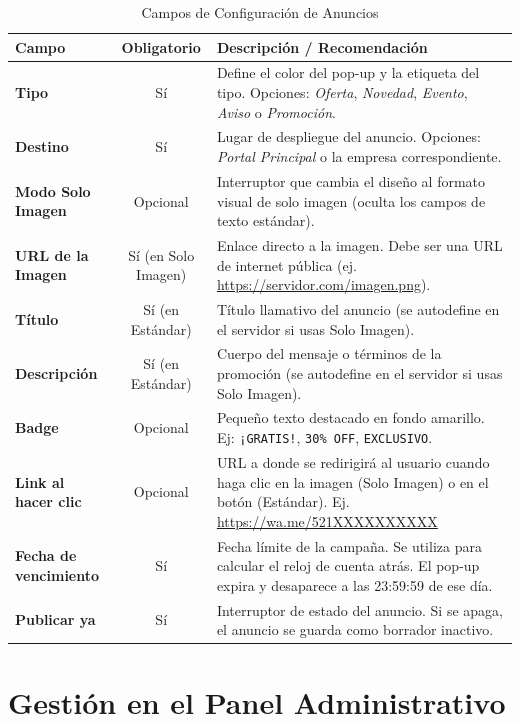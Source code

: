 \documentclass[11pt,a4paper]{article}
\begin{document}
\begin{table}[htbp]
\centering
\caption{Campos de Configuración de Anuncios}
\label{tab:campos}
\begin{tabular}{m{3cm} c m{9cm}}
\toprule
\textbf{Campo} & \textbf{Obligatorio} & \textbf{Descripción / Recomendación} \\
\midrule
\textbf{Tipo} & Sí & Define el color del pop-up y la etiqueta del tipo. Opciones: \textit{Oferta}, \textit{Novedad}, \textit{Evento}, \textit{Aviso} o \textit{Promoción}. \\
\addlinespace
\textbf{Destino} & Sí & Lugar de despliegue del anuncio. Opciones: \textit{Portal Principal} o la empresa correspondiente. \\
\addlinespace
\textbf{Modo Solo Imagen} & Opcional & Interruptor que cambia el diseño al formato visual de solo imagen (oculta los campos de texto estándar). \\
\addlinespace
\textbf{URL de la Imagen} & Sí (en Solo Imagen) & Enlace directo a la imagen. Debe ser una URL de internet pública (ej. \url{https://servidor.com/imagen.png}). \\
\addlinespace
\textbf{Título} & Sí (en Estándar) & Título llamativo del anuncio (se autodefine en el servidor si usas Solo Imagen). \\
\addlinespace
\textbf{Descripción} & Sí (en Estándar) & Cuerpo del mensaje o términos de la promoción (se autodefine en el servidor si usas Solo Imagen). \\
\addlinespace
\textbf{Badge} & Opcional & Pequeño texto destacado en fondo amarillo. Ej: \texttt{¡GRATIS!}, \texttt{30\% OFF}, \texttt{EXCLUSIVO}. \\
\addlinespace
\textbf{Link al hacer clic} & Opcional & URL a donde se redirigirá al usuario cuando haga clic en la imagen (Solo Imagen) o en el botón (Estándar). Ej. \url{https://wa.me/521XXXXXXXXXX} \\
\addlinespace
\textbf{Fecha de vencimiento} & Sí & Fecha límite de la campaña. Se utiliza para calcular el reloj de cuenta atrás. El pop-up expira y desaparece a las 23:59:59 de ese día. \\
\addlinespace
\textbf{Publicar ya} & Sí & Interruptor de estado del anuncio. Si se apaga, el anuncio se guarda como borrador inactivo. \\
\bottomrule
\end{tabular}
\end{table}

\section{Gestión en el Panel Administrativo}
\end{document}
